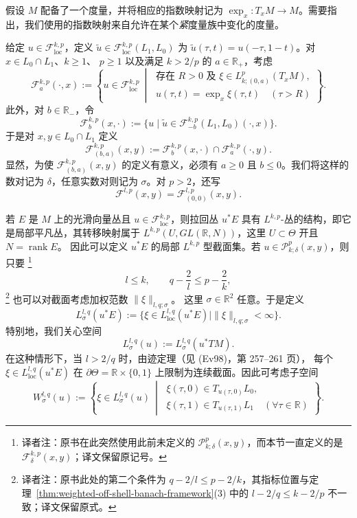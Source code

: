 假设 $M$ 配备了一个度量，并将相应的指数映射记为
$\exp_x:T_xM\to M$。需要指出，我们使用的指数映射来自允许在某个\emph{紧}\personRiemann{}度量族中变化的度量。

给定 $u\in\mathcal F_{\mathrm{loc}}^{k,p}$，定义
$\widetilde u\in\mathcal F_{\mathrm{loc}}^{k,p}(L_1,L_0)$ 为
$\widetilde u(\tau,t)=u(-\tau,1-t)$。对 $x\in L_0\cap L_1$、$k\geq1$、
$p\geq1$ 以及满足 $k>2/p$ 的 $a\in\mathbb R_+$，考虑
\[
 \mathcal F_a^{k,p}(\cdot,x)
 :=\left\{u\in\mathcal F_{\mathrm{loc}}^{k,p}\ \middle|\
 \begin{array}{l}
 \text{存在 }R>0\text{ 及 }\xi\in L_{k;(0,a)}^p(T_xM),\\
 u(\tau,t)=\exp_x\xi(\tau,t)\quad(\tau>R)
 \end{array}\right\}.
\]
此外，对 $b\in\mathbb R_-$，令
\[
 \mathcal F_b^{k,p}(x,\cdot)
 :=\{u\mid\widetilde u\in\mathcal F_{-b}^{k,p}(L_1,L_0)(\cdot,x)\}.
\]
于是对 $x,y\in L_0\cap L_1$ 定义
\[
 \mathcal F_{(b,a)}^{k,p}(x,y)
 :=\mathcal F_b^{k,p}(x,\cdot)\cap\mathcal F_a^{k,p}(\cdot,y).
\]
显然，为使 $\mathcal F_{(b,a)}^{k,p}(x,y)$ 的定义有意义，必须有
$a\geq0$ 且 $b\leq0$。我们将这样的数对记为 $\delta$，任意实数对则记为
$\sigma$。对 $p>2$，还写
\[
 \mathcal F^{l,p}(x,y)=\mathcal F_{(0,0)}^{l,p}(x,y).
\]

若 $E$ 是 $M$ 上的光滑向量丛且 $u\in\mathcal F_{\mathrm{loc}}^{k,p}$，则拉回丛
$u^*E$ 具有 $L^{k,p}$-丛的结构，即它是局部平凡丛，其转移映射属于
$L^{k,p}(U,GL(\mathbb R,N))$，这里 $U\subset\Theta$ 开且 $N=\operatorname{rank}E$。
因此可以定义 $u^*E$ 的局部 $L^{k,p}$ 型截面集。若
$u\in\mathcal P_{k;\delta}^p(x,y)$，则只要
\footnote{译者注：原书在此突然使用此前未定义的
$\mathcal P_{k;\delta}^p(x,y)$，而本节一直定义的是
$\mathcal F_{\delta}^{k,p}(x,y)$；译文保留原记号。}
\[
 l\leq k,\qquad q-\frac2l\leq p-\frac2k,
\]
\footnote{译者注：原书此处的第二个条件为
$q-2/l\leq p-2/k$，其指标位置与定理~\ref{thm:weighted-off-shell-banach-framework}(3)
中的 $l-2/q\leq k-2/p$ 不一致；译文保留原式。}
也可以对截面考虑加权\personSobolev{}范数 $\|\xi\|_{l,q;\sigma}$。
这里 $\sigma\in\mathbb R^2$ 任意。于是定义
\begin{equation}
 L_\sigma^{l,q}(u^*E)
 :=\{\xi\in L_{\mathrm{loc}}^{l,q}(u^*E)\mid\|\xi\|_{l,q;\sigma}<\infty\}.
 \label{eq:weighted-sections-pullback}
\end{equation}
特别地，我们关心\personBanach{}空间
\[
 L_\sigma^{l,q}(u):=L_\sigma^{l,q}(u^*TM).
\]
在这种情形下，当 $l>2/q$ 时，由迹定理（见 (Ev98)，第 257--261 页），
每个 $\xi\in L_{\mathrm{loc}}^{l,q}(u^*E)$ 在
$\partial\Theta=\mathbb R\times\{0,1\}$ 上限制为连续截面。因此可考虑子空间
\[
 W_\sigma^{l,q}(u):=\left\{\xi\in L_\sigma^{l,q}(u)\ \middle|\
 \begin{array}{l}
 \xi(\tau,0)\in T_{u(\tau,0)}L_0,\\
 \xi(\tau,1)\in T_{u(\tau,1)}L_1\quad(\forall\tau\in\mathbb R)
 \end{array}\right\}.
\]

